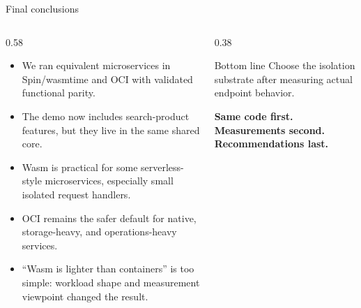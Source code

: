 \documentclass[aspectratio=169,10pt]{beamer}
\begin{document}
\begin{frame}{Final conclusions}
  \begin{columns}[T,onlytextwidth]
    \begin{column}{0.58\linewidth}
      \begin{itemize}
        \item We ran equivalent microservices in Spin/wasmtime and OCI with validated functional parity.
        \item The demo now includes search-product features, but they live in the same shared core.
        \item Wasm is practical for some serverless-style microservices, especially small isolated request handlers.
        \item OCI remains the safer default for native, storage-heavy, and operations-heavy services.
        \item ``Wasm is lighter than containers'' is too simple: workload shape and measurement viewpoint changed the result.
      \end{itemize}
    \end{column}
    \begin{column}{0.38\linewidth}
      \begin{block}{Bottom line}
        Choose the isolation substrate after measuring actual endpoint behavior.
      \end{block}

      \vspace{4mm}
      \textbf{Same code first.}\\
      \textbf{Measurements second.}\\
      \textbf{Recommendations last.}
    \end{column}
  \end{columns}
\end{frame}
\end{document}
